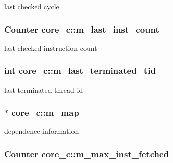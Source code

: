 \label{classcore__c_aaeba580eada653812b7550c7805891cb}
last checked cycle \hypertarget{classcore__c_a1cdfd88596ec0d6b7f7f0fe688f03023}{
\subsubsection[{m\_\-last\_\-inst\_\-count}]{\setlength{\rightskip}{0pt plus 5cm}Counter {\bf core\_\-c::m\_\-last\_\-inst\_\-count}}}
\label{classcore__c_a1cdfd88596ec0d6b7f7f0fe688f03023}
last checked instruction count \hypertarget{classcore__c_a64d9467a87d78acc11074627d138d1ea}{
\subsubsection[{m\_\-last\_\-terminated\_\-tid}]{\setlength{\rightskip}{0pt plus 5cm}int {\bf core\_\-c::m\_\-last\_\-terminated\_\-tid}}}
\label{classcore__c_a64d9467a87d78acc11074627d138d1ea}
last terminated thread id \hypertarget{classcore__c_add5704c9cc600653514b61560307d961}{
\subsubsection[{m\_\-map}]{$\ast$ {\bf core\_\-c::m\_\-map}}}
\label{classcore__c_add5704c9cc600653514b61560307d961}
dependence information \hypertarget{classcore__c_a8de59f8588f5fb79f027f20e478ec6f3}{
\subsubsection[{m\_\-max\_\-inst\_\-fetched}]{\setlength{\rightskip}{0pt plus 5cm}Counter {\bf core\_\-c::m\_\-max\_\-inst\_\-fetched}}}
